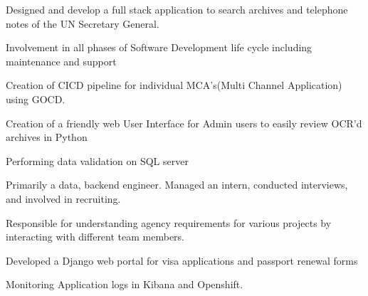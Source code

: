 \documentclass[]{deedy-resume-openfont}
\begin{document}
\begin{minipage}[t][18cm]{0.66\textwidth}
\begin{tightemize}
\end{tightemize}
\sectionsep

\begin{tightemize}
\item Designed and develop a full stack application to search archives and telephone notes of the UN Secretary General.
\item Involvement in all phases of Software Development life cycle including maintenance and support 
\item Creation of CICD pipeline for individual MCA's(Multi Channel Application) using GOCD.
\item  Creation of a friendly web User Interface for Admin users to easily review OCR'd archives in Python
\item Performing data validation on SQL server
\end{tightemize}
\sectionsep

\begin{tightemize}
\item Primarily a data, backend engineer. Managed an
intern, conducted interviews, and involved in recruiting.
\item Responsible for understanding agency requirements for various projects by interacting with different team members.
\item Developed a Django web portal for visa applications and passport renewal forms
\item Monitoring Application logs in Kibana and Openshift.

\end{tightemize}
\sectionsep





\end{minipage}
\end{document}
